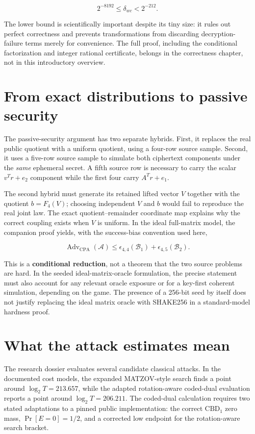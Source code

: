 \documentclass[
  11pt,
  a4paper,
  oneside]{report}
\begin{document}
\[
\boxed{2^{-8192}\le\delta_{wc}<2^{-212}.}
\]

The lower bound is scientifically important despite its tiny size: it
rules out perfect correctness and prevents transformations from
discarding decryption-failure terms merely for convenience. The full
proof, including the conditional factorization and integer rational
certificate, belongs in the correctness chapter, not in this
introductory overview.

\section{From exact distributions to passive
security}\label{from-exact-distributions-to-passive-security}

The passive-security argument has two separate hybrids. First, it
replaces the real public quotient with a uniform quotient, using a
four-row source sample. Second, it uses a five-row source sample to
simulate both ciphertext components under the \emph{same} ephemeral
secret. A fifth source row is necessary to carry the scalar \(v^Tr+e_2\)
component while the first four carry \(A^Tr+e_1\).

The second hybrid must generate its retained lifted vector \(V\)
together with the quotient \(b=F_4(V)\); choosing independent \(V\) and
\(b\) would fail to reproduce the real joint law. The exact
quotient--remainder coordinate map explains why the correct coupling
exists when \(V\) is uniform. In the ideal full-matrix model, the
companion proof yields, with the success-bias convention used here,

\[
\operatorname{Adv}_{\mathrm{CPA}}(\mathcal A)
\le \epsilon_{4,4}(\mathcal B_1)
+\epsilon_{4,5}(\mathcal B_2).
\]

This is a \textbf{conditional reduction}, not a theorem that the two
source problems are hard. In the seeded ideal-matrix-oracle formulation,
the precise statement must also account for any relevant oracle exposure
or for a key-first coherent simulation, depending on the game. The
presence of a 256-bit seed by itself does not justify replacing the
ideal matrix oracle with SHAKE256 in a standard-model hardness proof.

\section{What the attack estimates
mean}\label{what-the-attack-estimates-mean}

The research dossier evaluates several candidate classical attacks. In
the documented cost models, the expanded MATZOV-style search finds a
point around \(\log_2T=213.657\), while the adapted rotation-aware
coded-dual evaluation reports a point around \(\log_2T=206.211\). The
coded-dual calculation requires two stated adaptations to a pinned
public implementation: the correct \(\mathrm{CBD}_1\) zero mass,
\(\Pr[E=0]=1/2\), and a corrected low endpoint for the rotation-aware
search bracket.
\end{document}
